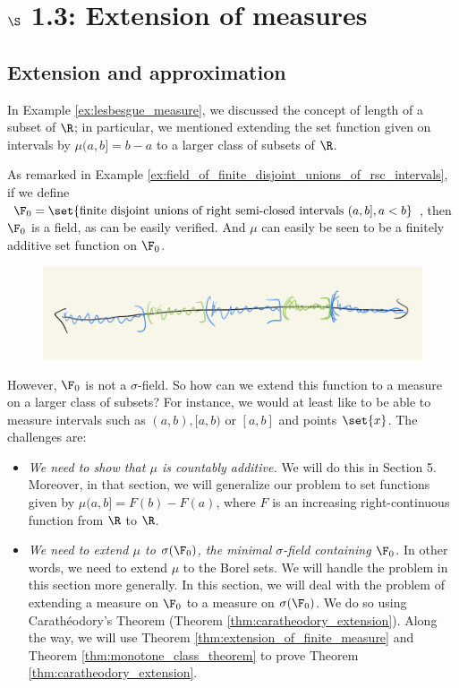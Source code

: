 \documentclass{article} %
\begin{document}





 \section{$\S$ 1.3: Extension of measures} \label{sec:extension_of_measures}
 
 
\subsection{Extension and approximation} \label{sec:extension_and_approximation}
 
In Example \ref{ex:lesbesgue_measure}, we discussed the concept of length of a subset of $\R$; in particular, we mentioned extending the set function given on intervals by $\mu(a,b] = b-a$ to a larger class of subsets of $\R$.  


 As remarked in Example \ref{ex:field_of_finite_disjoint_unions_of_rsc_intervals}, if we define $\F_0 = \set{\text{finite disjoint unions of right semi-closed intervals } (a,b], a < b}$, then $\F_0$ is a field, as can be easily verified.  And $\mu$ can easily be seen to be a finitely additive set function on $\F_0$.   

\begin{figure}[H]
\centering
\includegraphics[width=.6\textwidth]{images/rsc_intervals}	
\end{figure}

However, $\F_0$ is not a $\sigma$-field.   So how can we extend this function to a measure on a larger class of subsets?  For instance, we would at least like to be able to measure intervals such as $(a,b), [a,b)$ or $[a,b]$ and points $\set{x}$.   The challenges are:

\begin{itemize}
\item \textit{We need to show that $\mu$ is countably additive.} We will do this in Section 5.   Moreover, in that section, we will generalize our problem to set functions given by $\mu(a,b] = F(b)-F(a)$, where $F$ is an increasing right-continuous function from $\R$ to $\R$.
\item \textit{We need to extend $\mu$ to $\sigma(\F_0)$, the minimal $\sigma$-field containing $\F_0$.} In other words, we need to extend $\mu$ to the Borel sets.  We will handle the problem in this section more generally.  In this section, we will deal with the problem of extending a measure on $\F_0$ to a measure on $\sigma(\F_0)$. We do so using Carath\'eodory's Theorem  (Theorem \ref{thm:caratheodory_extension}).  Along the way, we will use Theorem \ref{thm:extension_of_finite_measure} and Theorem \ref{thm:monotone_class_theorem} to prove Theorem \ref{thm:caratheodory_extension}. 
\end{itemize}
\end{document}

